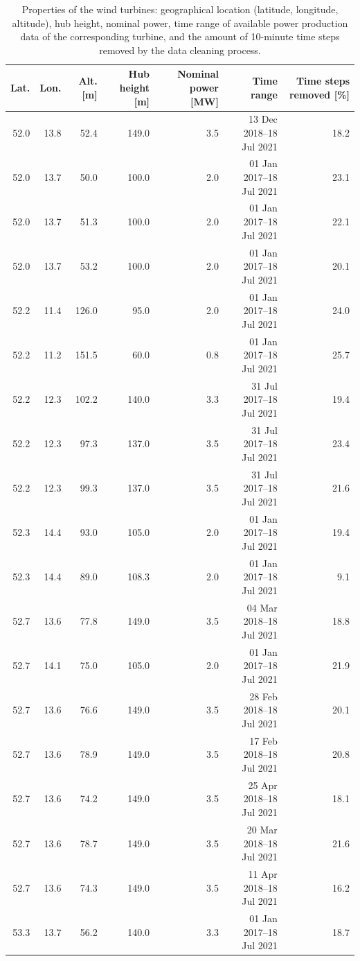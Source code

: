 \begin{table}
\caption{
    Properties of the wind turbines:
	geographical location (latitude, longitude, altitude),
	hub height, nominal power,
	time range of available power production data
	of the corresponding turbine, and the amount of 10-minute time steps removed by the
    data cleaning process.
    }
\label{turbines}
\begin{tabular}{rrrrrrr}
\toprule
Lat. & Lon. & Alt. [m] & Hub height [m] & Nominal power [MW] & Time range & Time steps removed [\%] \\
\midrule
52.0 & 13.8 & 52.4 & 149.0 & 3.5 & 13 Dec 2018--18 Jul 2021 & 18.2 \\
52.0 & 13.7 & 50.0 & 100.0 & 2.0 & 01 Jan 2017--18 Jul 2021 & 23.1 \\
52.0 & 13.7 & 51.3 & 100.0 & 2.0 & 01 Jan 2017--18 Jul 2021 & 22.1 \\
52.0 & 13.7 & 53.2 & 100.0 & 2.0 & 01 Jan 2017--18 Jul 2021 & 20.1 \\
52.2 & 11.4 & 126.0 & 95.0 & 2.0 & 01 Jan 2017--18 Jul 2021 & 24.0 \\
52.2 & 11.2 & 151.5 & 60.0 & 0.8 & 01 Jan 2017--18 Jul 2021 & 25.7 \\
52.2 & 12.3 & 102.2 & 140.0 & 3.3 & 31 Jul 2017--18 Jul 2021 & 19.4 \\
52.2 & 12.3 & 97.3 & 137.0 & 3.5 & 31 Jul 2017--18 Jul 2021 & 23.4 \\
52.2 & 12.3 & 99.3 & 137.0 & 3.5 & 31 Jul 2017--18 Jul 2021 & 21.6 \\
52.3 & 14.4 & 93.0 & 105.0 & 2.0 & 01 Jan 2017--18 Jul 2021 & 19.4 \\
52.3 & 14.4 & 89.0 & 108.3 & 2.0 & 01 Jan 2017--18 Jul 2021 & 9.1 \\
52.7 & 13.6 & 77.8 & 149.0 & 3.5 & 04 Mar 2018--18 Jul 2021 & 18.8 \\
52.7 & 14.1 & 75.0 & 105.0 & 2.0 & 01 Jan 2017--18 Jul 2021 & 21.9 \\
52.7 & 13.6 & 76.6 & 149.0 & 3.5 & 28 Feb 2018--18 Jul 2021 & 20.1 \\
52.7 & 13.6 & 78.9 & 149.0 & 3.5 & 17 Feb 2018--18 Jul 2021 & 20.8 \\
52.7 & 13.6 & 74.2 & 149.0 & 3.5 & 25 Apr 2018--18 Jul 2021 & 18.1 \\
52.7 & 13.6 & 78.7 & 149.0 & 3.5 & 20 Mar 2018--18 Jul 2021 & 21.6 \\
52.7 & 13.6 & 74.3 & 149.0 & 3.5 & 11 Apr 2018--18 Jul 2021 & 16.2 \\
53.3 & 13.7 & 56.2 & 140.0 & 3.3 & 01 Jan 2017--18 Jul 2021 & 18.7 \\

\end{tabular}
\end{table}
